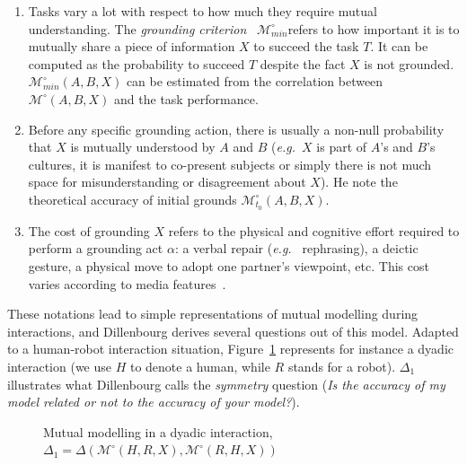 \documentclass{sig-alternate}
\newcommand{\eg}{{\textit{e.g.~}}}
\newcommand{\Model}[3]{{$\mathcal{M}^{\circ}(#1, #2, #3)$}}
\newcommand{\groundingcriterion}{{$\mathcal{M}^{\circ}_{min}$}}
\begin{document}
\begin{enumerate}

    \item Tasks vary a lot with respect to how much they require mutual
        understanding.  The \emph{grounding criterion}~\cite{clark1986referring}
        \groundingcriterion refers to
        how important it is to mutually share a piece of information $X$ to
        succeed the task $T$. It can be computed as the probability to succeed $T$
        despite the fact $X$ is not grounded. $\mathcal{M}^{\circ}_{min}(A,B,X)$
        can be estimated from the correlation between \Model{A}{B}{X} and the task
        performance. 

    \item Before any specific grounding action, there is usually a non-null
        probability that $X$ is mutually understood by $A$ and $B$ (\eg $X$
        is part of $A$'s and $B$'s cultures, it is manifest to co-present
        subjects or simply there is not much space for misunderstanding
        or disagreement about $X$). He note the theoretical accuracy of
        initial grounds $\mathcal{M}^{\circ}_{t_0}(A,B,X)$.

    \item The cost of grounding $X$ refers to the physical and cognitive effort
        required to perform a grounding act $\alpha$: a verbal repair (\eg
        rephrasing), a deictic gesture, a physical move to adopt one partner's
        viewpoint, etc. This cost varies according to media
        features~\cite{clark1991grounding}.

\end{enumerate}

These notations lead to simple representations of mutual modelling during
interactions, and Dillenbourg derives several questions out of this model.
Adapted to a human-robot interaction situation, Figure~\ref{mm_symmetry}
represents for instance a dyadic interaction (we use $H$ to denote a
human, while $R$ stands for a robot). $\Delta_1$ illustrates what Dillenbourg
calls the \emph{symmetry} question ({\it Is the accuracy of my model related or
not to the accuracy of your model?}).

\begin{figure}[htb]
\centering


\caption{\small Mutual modelling in a dyadic interaction, $\Delta_1 =
    \Delta(\mathcal{M}^{\circ} (H,R,X),
\mathcal{M}^{\circ} (R,H,X))$}

\label{mm_symmetry}
\end{figure}
\end{document}
